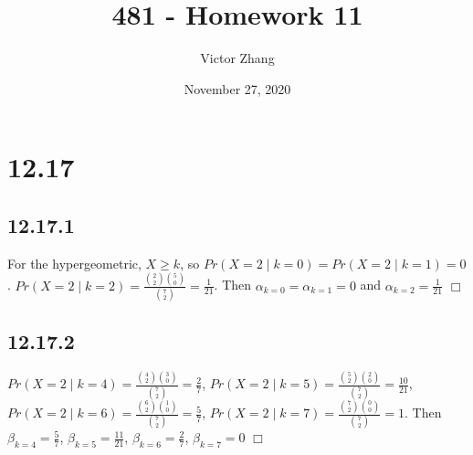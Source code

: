 \documentclass{article}
\title{481 - Homework 11}
\author{Victor Zhang}
\date{November 27, 2020}
\begin{document}
\maketitle

\section*{12.17}
\subsection*{12.17.1}
For the hypergeometric, $X \geq k$, so $Pr(X = 2 \;|\; k=0) = Pr(X=2 \;|\; k=1) = 0$. $Pr(X = 2 \;|\; k=2) = \frac{\binom{2}{2}\binom{5}{0}}{\binom{7}{2}} = \frac{1}{21}$. Then $\alpha_{k=0} = \alpha_{k=1} = 0$ and $\alpha_{k=2} = \frac{1}{21}$ $\Box$

\subsection*{12.17.2}
$Pr(X = 2 \;|\; k = 4) = \frac{\binom{4}{2}\binom{3}{0}}{\binom{7}{2}} = \frac{2}{7}$, $Pr(X = 2 \;|\; k = 5) = \frac{\binom{5}{2}\binom{2}{0}}{\binom{7}{2}} = \frac{10}{21}$, $Pr(X = 2 \;|\; k = 6) = \frac{\binom{6}{2}\binom{1}{0}}{\binom{7}{2}} = \frac{5}{7}$, $Pr(X = 2 \;|\; k = 7) = \frac{\binom{7}{2}\binom{0}{0}}{\binom{7}{2}} = 1$. Then $\beta_{k=4} = \frac{5}{7}$, $\beta_{k=5} = \frac{11}{21}$, $\beta_{k=6} = \frac{2}{7}$, $\beta_{k=7} = 0$ $\Box$
\begin{figure}[ht]
\centering
{}
\end{figure}
\end{document}
